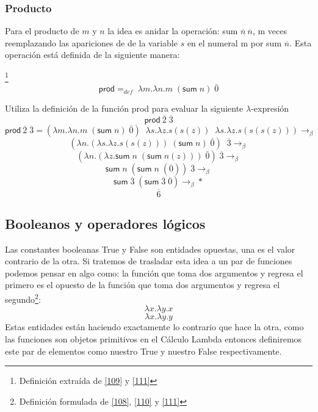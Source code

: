         \subsubsection{Producto}
        Para el producto de $m$ y $n$ la idea es anidar la operación: \textsf{sum} $\overline{n}\ \overline{n}$, m veces reemplazando las apariciones de de la variable $s$ en el numeral m por \textsf{sum} $\overline{n}$. Esta operación está definida de la siguiente manera:

        \begin{definition}\footnote{Definición extraída de \hyperlink{109}{[109]} y  \hyperlink{111}{[111]}}
            $$\textsf{prod} =_{def}  \; \lambda m.\lambda n.m\; (\textsf{sum}\;n) \;  \bar{0}$$
        \end{definition}

        \begin{exercise}
            Utiliza la definición de la función \textsf{prod} para evaluar la siguiente  $\lambda$-expresión
            \[
                    \textsf{prod}\  \overline{2} \; \overline{3} 
            \]
           \[
			 \textsf{prod}\  \overline{2} \; \overline{3}  = (\lambda m.\lambda n.m\; (\textsf{sum}\;n) \;  \bar{0}) \;\; \lambda s. \lambda z.s(s(z)) \;\; \lambda s. \lambda z.s(s(s(z))) \rightarrow_\beta
	     \]
	     \[
			(\lambda n. ( \lambda s. \lambda z.s(s(z)))\; (\textsf{sum} \; n) \;  \bar{0}) \;\;  \overline{3}   \rightarrow_\beta
	     \]
	     \[
			(\lambda n. (\lambda z.\textsf{sum} \; n \; (\textsf{sum} \; n(z))) \;  \bar{0}) \;  \overline{3}  \rightarrow_\beta
	     \]
	     \[
			\textsf{sum} \; n \; (\textsf{sum} \; n \; (\overline{0})) \; \overline{3}  \rightarrow_\beta
	     \]
	     \[
	       	\textsf{sum} \; \overline{3} \; (\textsf{sum} \; \overline{3} \; \overline{0})  \rightarrow_\beta*
            \]
	    \[
		\overline{6}
	    \]


        \end{exercise}

    \subsection{Booleanos y operadores lógicos}
    Las constantes booleanas \textsf{True} y \textsf{False} son entidades opuestas, una es el valor contrario de la otra. Si tratemos de trasladar esta idea a un par de funciones podemos pensar en algo como:
    la función que toma dos argumentos y regresa el primero es el opuesto de la función que toma dos argumentos y regresa el segundo\footnote{Definición formulada de \hyperlink{108}{[108]},  \hyperlink{110}{[110]} y  \hyperlink{111}{[111]}}:
    \[
        \lambda x.\lambda y.x
    \]
    \[
        \lambda x.\lambda y.y
    \]
    Estas entidades están haciendo exactamente lo contrario que hace la otra, como las funciones son objetos primitivos en el Cálculo Lambda entonces definiremos este par de elementos como nuestro \textsf{True} y nuestro \textsf{False} respectivamente.

